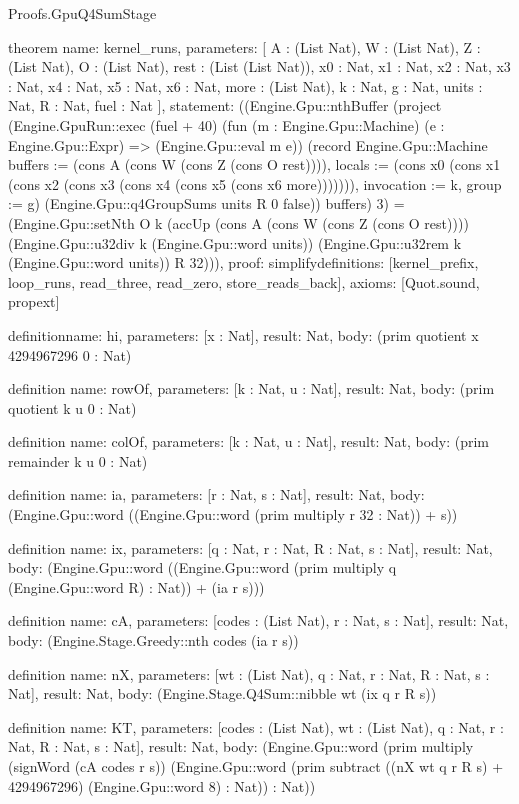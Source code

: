 \begin{lexlean}{Proofs.GpuQ4SumStage}
\begin{semanticmodule}
theorem{
  name: kernel_runs,
  parameters: [
    A : (List Nat),
    W : (List Nat),
    Z : (List Nat),
    O : (List Nat),
    rest : (List (List Nat)),
    x0 : Nat,
    x1 : Nat,
    x2 : Nat,
    x3 : Nat,
    x4 : Nat,
    x5 : Nat,
    x6 : Nat,
    more : (List Nat),
    k : Nat,
    g : Nat,
    units : Nat,
    R : Nat,
    fuel : Nat
  ],
  statement: ((Engine.Gpu::nthBuffer (project (Engine.GpuRun::exec (fuel + 40) (fun (m : Engine.Gpu::Machine) (e : Engine.Gpu::Expr) => (Engine.Gpu::eval m e)) (record Engine.Gpu::Machine {buffers := (cons A (cons W (cons Z (cons O rest)))), locals := (cons x0 (cons x1 (cons x2 (cons x3 (cons x4 (cons x5 (cons x6 more))))))), invocation := k, group := g}) (Engine.Gpu::q4GroupSums units R 0 false)) buffers) 3) = (Engine.Gpu::setNth O k (accUp (cons A (cons W (cons Z (cons O rest)))) (Engine.Gpu::u32div k (Engine.Gpu::word units)) (Engine.Gpu::u32rem k (Engine.Gpu::word units)) R 32))),
  proof: simplify{definitions: [kernel_prefix, loop_runs, read_three, read_zero, store_reads_back]},
  axioms: [Quot.sound, propext]
}

definition{name: hi, parameters: [x : Nat], result: Nat, body: (prim quotient x 4294967296 0 : Nat)}

definition{
  name: rowOf,
  parameters: [k : Nat, u : Nat],
  result: Nat,
  body: (prim quotient k u 0 : Nat)
}

definition{
  name: colOf,
  parameters: [k : Nat, u : Nat],
  result: Nat,
  body: (prim remainder k u 0 : Nat)
}

definition{
  name: ia,
  parameters: [r : Nat, s : Nat],
  result: Nat,
  body: (Engine.Gpu::word ((Engine.Gpu::word (prim multiply r 32 : Nat)) + s))
}

definition{
  name: ix,
  parameters: [q : Nat, r : Nat, R : Nat, s : Nat],
  result: Nat,
  body: (Engine.Gpu::word ((Engine.Gpu::word (prim multiply q (Engine.Gpu::word R) : Nat)) + (ia r s)))
}

definition{
  name: cA,
  parameters: [codes : (List Nat), r : Nat, s : Nat],
  result: Nat,
  body: (Engine.Stage.Greedy::nth codes (ia r s))
}

definition{
  name: nX,
  parameters: [wt : (List Nat), q : Nat, r : Nat, R : Nat, s : Nat],
  result: Nat,
  body: (Engine.Stage.Q4Sum::nibble wt (ix q r R s))
}

definition{
  name: KT,
  parameters: [codes : (List Nat), wt : (List Nat), q : Nat, r : Nat, R : Nat, s : Nat],
  result: Nat,
  body: (Engine.Gpu::word (prim multiply (signWord (cA codes r s)) (Engine.Gpu::word (prim subtract ((nX wt q r R s) + 4294967296) (Engine.Gpu::word 8) : Nat)) : Nat))
}


\end{semanticmodule}
\end{lexlean}
